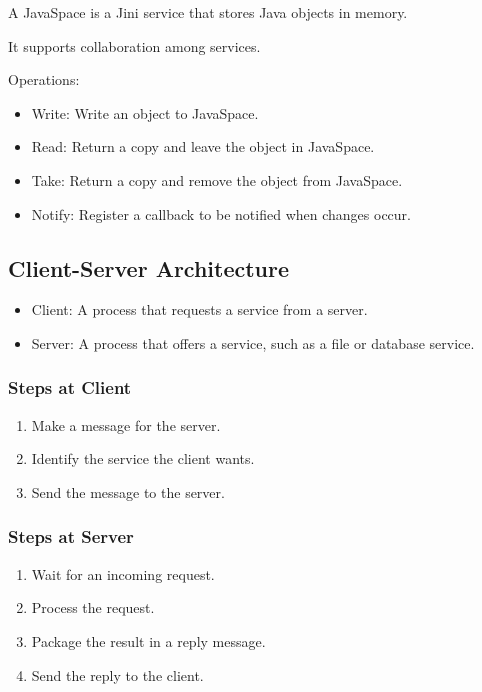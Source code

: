 \documentclass{article}
\begin{document}
A JavaSpace is a Jini service that stores Java objects in memory.

It supports collaboration among services.

Operations:

\begin{itemize}
    \item Write: Write an object to JavaSpace.
    \item Read: Return a copy and leave the object in JavaSpace.
    \item Take: Return a copy and remove the object from JavaSpace.
    \item Notify: Register a callback to be notified when changes occur.
\end{itemize}

\subsection{Client-Server Architecture}

\begin{itemize}
    \item Client: A process that requests a service from a server.
    \item Server: A process that offers a service, such as a file or database service.
\end{itemize}

\subsubsection{Steps at Client}

\begin{enumerate}
    \item Make a message for the server.
    \item Identify the service the client wants.
    \item Send the message to the server.
\end{enumerate}

\subsubsection{Steps at Server}

\begin{enumerate}
    \item Wait for an incoming request.
    \item Process the request.
    \item Package the result in a reply message.
    \item Send the reply to the client.
\end{enumerate}
\end{document}
